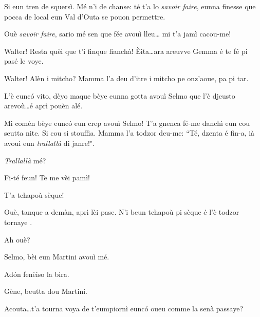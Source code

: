 \begin{drama}

\Genespeaks Si eun tren de squersì. Mé n'i de chanse: té t'a lo \textit{savoir faire}, eunna finesse que pocca de local eun Val d'Outa se pouon permettre.

\Walterspeaks	{} Ouè \textit{savoir faire}, sario mé sen que fée avouì lleu\ldots {} mi t'a jamì cacou-me!

\Dorinaspeaks Walter! Resta quèi que t'i finque fianchà! \`Eita\ldots ara areuvve Gemma é te fé pi pasé le voye.


\Gemmaspeaks{} Walter! Alèn i mitcho? Mamma l'a deu d'itre i mitcho pe onz'aoue, pa pi tar.

\Walterspeaks	L'è eunc\'o vito, dèyo maque  bèye eunna gotta avouì Selmo que l'è djeusto arevoù\ldots é aprì pouèn alé.

\Gemmaspeaks{} Mi comèn bèye eunc\'o eun crep avouì Selmo! T'a gnenca fé-me danchì eun cou seutta nite. Si cou si stouffia. Mamma l'a todzor deu-me: ``Té, dzenta é fin-a, ià avouì eun \textit{trallallà} di janre!".

\Walterspeaks	\textit{Trallallà} mé?

\Gemmaspeaks Fi-té feun! Te me vèi pamì! 


\Selmospeaks{} T'a tchapoù sèque!

\Walterspeaks	Ouè, tanque a demàn, aprì lèi pase. N'i beun tchapoù pi sèque é l'è todzor tornaye	.

\Selmospeaks Ah ouè?

\Walterspeaks{} Selmo, bèi eun Martini avouì mé.

\Selmospeaks Ad\'on fenèiso la bira.

\Walterspeaks{} Gène, beutta dou Martini.

\Genespeaks Acouta\ldots t'a tourna voya de t'eumpiornì eunc\'o oueu comme la senà passaye?


\end{drama}
